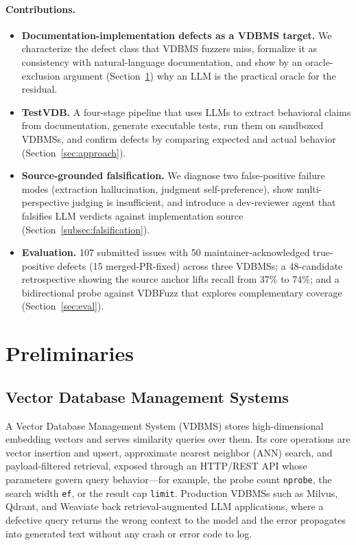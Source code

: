 \documentclass[sigconf]{acmart}
\begin{document}
\paragraph{Contributions.}
\begin{itemize}
  \item \textbf{Documentation-implementation defects as a VDBMS target.} We characterize the defect class that VDBMS fuzzers miss, formalize it as consistency with natural-language documentation, and show by an oracle-exclusion argument (Section~\ref{sec:prelim}) why an LLM is the practical oracle for the residual.
  \item \textbf{TestVDB.} A four-stage pipeline that uses LLMs to extract behavioral claims from documentation, generate executable tests, run them on sandboxed VDBMSs, and confirm defects by comparing expected and actual behavior (Section~\ref{sec:approach}).
  \item \textbf{Source-grounded falsification.} We diagnose two false-positive failure modes (extraction hallucination, judgment self-preference), show multi-perspective judging is insufficient, and introduce a dev-reviewer agent that falsifies LLM verdicts against implementation source (Section~\ref{subsec:falsification}).
  \item \textbf{Evaluation.} 107 submitted issues with 50 maintainer-acknowledged true-positive defects (15 merged-PR-fixed) across three VDBMSs; a 48-candidate retrospective showing the source anchor lifts recall from 37\% to 74\%; and a bidirectional probe against VDBFuzz that explores complementary coverage (Section~\ref{sec:eval}).
\end{itemize}

\section{Preliminaries}
\label{sec:prelim}

\subsection{Vector Database Management Systems}
\label{subsec:vdbms}

A Vector Database Management System (VDBMS) stores high-dimensional embedding vectors and serves similarity queries over them. Its core operations are vector insertion and upsert, approximate nearest neighbor (ANN) search, and payload-filtered retrieval, exposed through an HTTP/REST API whose parameters govern query behavior---for example, the probe count \texttt{nprobe}, the search width \texttt{ef}, or the result cap \texttt{limit}. Production VDBMSs such as Milvus, Qdrant, and Weaviate back retrieval-augmented LLM applications, where a defective query returns the wrong context to the model and the error propagates into generated text without any crash or error code to log.
\end{document}
